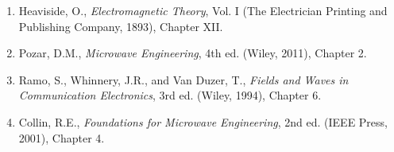 \begin{enumerate}
\item Heaviside, O., \textit{Electromagnetic Theory}, Vol. I (The Electrician Printing and Publishing Company, 1893), Chapter XII.
\item Pozar, D.M., \textit{Microwave Engineering}, 4th ed. (Wiley, 2011), Chapter 2.
\item Ramo, S., Whinnery, J.R., and Van Duzer, T., \textit{Fields and Waves in Communication Electronics}, 3rd ed. (Wiley, 1994), Chapter 6.
\item Collin, R.E., \textit{Foundations for Microwave Engineering}, 2nd ed. (IEEE Press, 2001), Chapter 4.
\end{enumerate}



